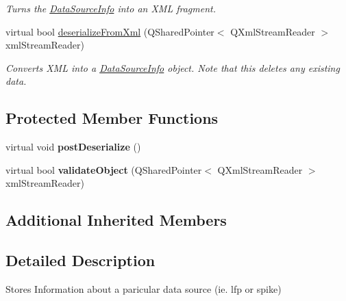 \begin{DoxyCompactItemize}
\begin{DoxyCompactList}\small\item\em Turns the \hyperlink{class_picto_1_1_data_source_info}{Data\-Source\-Info} into an X\-M\-L fragment. \end{DoxyCompactList}\item 
\hypertarget{class_picto_1_1_data_source_info_a764f00f8890dfc4c57e5c91c8071c8a5}{virtual bool \hyperlink{class_picto_1_1_data_source_info_a764f00f8890dfc4c57e5c91c8071c8a5}{deserialize\-From\-Xml} (Q\-Shared\-Pointer$<$ Q\-Xml\-Stream\-Reader $>$ xml\-Stream\-Reader)}\label{class_picto_1_1_data_source_info_a764f00f8890dfc4c57e5c91c8071c8a5}

\begin{DoxyCompactList}\small\item\em Converts X\-M\-L into a \hyperlink{class_picto_1_1_data_source_info}{Data\-Source\-Info} object. Note that this deletes any existing data. \end{DoxyCompactList}\end{DoxyCompactItemize}
\subsection*{Protected Member Functions}
\begin{DoxyCompactItemize}
\item 
\hypertarget{class_picto_1_1_data_source_info_ac196628c173d57948bb2cb5ac3d7e66d}{virtual void {\bfseries post\-Deserialize} ()}\label{class_picto_1_1_data_source_info_ac196628c173d57948bb2cb5ac3d7e66d}

\item 
\hypertarget{class_picto_1_1_data_source_info_a3776cf621bfe72bf7b9c4818264f8b66}{virtual bool {\bfseries validate\-Object} (Q\-Shared\-Pointer$<$ Q\-Xml\-Stream\-Reader $>$ xml\-Stream\-Reader)}\label{class_picto_1_1_data_source_info_a3776cf621bfe72bf7b9c4818264f8b66}

\end{DoxyCompactItemize}
\subsection*{Additional Inherited Members}


\subsection{Detailed Description}
Stores Information about a paricular data source (ie. lfp or spike) 

